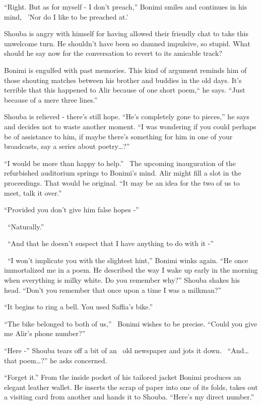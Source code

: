 \documentclass[twoside,11pt]{book}
\begin{document}
``Right. But as for myself - I don't preach,'' Bonimi smiles and continues in his mind,
\ {}'Nor do I like to be preached at.'

Shouba is angry with himself for having allowed their friendly chat to take this unwelcome turn. He shouldn't have been
so damned impulsive, so stupid. What should he say now for the conversation to revert to its amicable track?

Bonimi is engulfed with past memories. This kind of argument reminds him of those shouting matches between his brother
and buddies in the old days. It's terrible that this happened to Alir because of one short poem,`` he says. ``Just
because of{ }{a }mere three lines.''

Shouba is relieved - there's still hope. ``He's completely gone to pieces,'' he says and
decides not to waste another moment. ``I was wondering if you could perhaps be of assistance to him, if
maybe there's something for him in one of your broadcasts, say a series about poetry{\dots}?''

``I would be more than happy to help.'' \ The upcoming inauguration of the refurbished
auditorium springs to Bonimi's mind. Alir might fill a slot in the proceedings. That would be original.
``It may be an idea for the two of us to meet, talk it over.''

``Provided you don't give him false hopes -''

~``Naturally.''

~``And that he doesn't suspect that I have anything to do with it -''

~``I won't implicate you with the slightest hint,'' Bonimi winks again. ``He once
immortalized me in a poem. He described the way I wake up early in the morning when everything is milky white. Do you
remember why?'' Shouba shakes his head. ``Don't you remember that once upon a time I was a
milkman?''

``It begins to ring a bell. You used Saffia's bike.''

``The bike belonged to both of us,'' \ Bonimi wishes to be precise. ``Could you
give me Alir's phone number?''

``Here -'' Shouba tears off {a bit of an \ }old newspaper and jots it down.
\ ``And{\dots} that poem{\dots}?'' he asks concerned.

``Forget it.'' From the inside pocket of his tailored jacket Bonimi produces an elegant
leather wallet. He inserts the scrap of paper into one of its folds, takes out a visiting card from another and hands
it to Shouba. ``Here's my direct number.''
\end{document}
